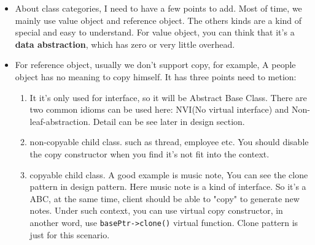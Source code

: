 \documentclass[a4paper,11pt,twoside]{book}
\begin{document}
\begin{itemize}
\begin{enumerate}
\begin{lstlisting}[numbers=none]
template <class T>
T f(T i){
	static_assert(
		std::is_integral<T>::value, "Int required.");
	return i;
}

int main() {
	std::cout << f(123) << '\n'; //output 123
}
\end{lstlisting}

    \item exception class. They are thrown by value but should be caught by reference. 

		\item Ancillary classes typically support specific idioms. such as RAII.  types that express unique ownership of a resource, such as \texttt{std::unique\_ptr}, are naturally move-only types, because they are not value-like (it doesn't make sense to copy them) but you do use them directly (not always by pointer or reference) and so want to move objects of this type around from one place to another.	

        \item Functor class, includes lambda. with operator() defined. This becomes more and more importants and win a seat in this list. 
	\end{enumerate}
    \item About class categories, I need to have a few points to add. Most of time, we mainly use value object and reference object. The others kinds are a kind of special and easy to understand. For value object, you can think that it's a \textbf{data abstraction}, which has zero or very little overhead. 
    \item For reference object, usually we don't support copy, for example, A people object has no meaning to copy himself. It has three points need to metion:
        \begin{enumerate}
            \item It it's only used for interface, so it will be Abstract Base Class. There are two common idioms can be used here: NVI(No virtual interface) and Non-leaf-abstraction. Detail can be see later in design section. 

            \item non-copyable child class. such as thread, employee etc. You should disable the copy constructor when you find it's not fit into the context.

            \item copyable child class. A good example is music note, You can see the clone pattern in design pattern. Here music note is a kind of interface. So it's a ABC, at the same time, client should be able to "copy" to generate new notes. Under such context, you can use virtual copy constructor, in another word, use \texttt{basePtr->clone()} virtual function. Clone pattern is just for this scenario. 

        \end{enumerate}
\end{itemize}
\end{document}
